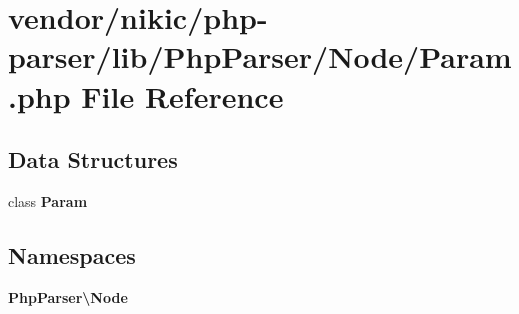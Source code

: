 \section{vendor/nikic/php-\/parser/lib/\+Php\+Parser/\+Node/\+Param.php File Reference}
\label{_node_2_param_8php}
\subsection*{Data Structures}
\begin{DoxyCompactItemize}
\item 
class {\bf Param}
\end{DoxyCompactItemize}
\subsection*{Namespaces}
\begin{DoxyCompactItemize}
\item 
 {\bf Php\+Parser\textbackslash{}\+Node}
\end{DoxyCompactItemize}

